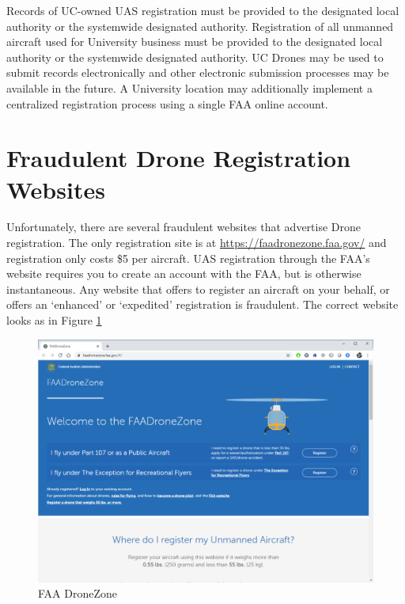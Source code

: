 \documentclass[
]{book}
\begin{document}
Records of UC-owned UAS registration must be provided to the designated local authority or the systemwide designated authority. Registration of all unmanned aircraft used for University business must be provided to the designated local authority or the systemwide designated authority. UC Drones may be used to submit records electronically and other electronic submission processes may be available in the future. A University location may additionally implement a centralized registration process using a single FAA online account.

\hypertarget{fraudulent-drone-registration-websites}{%
\section{Fraudulent Drone Registration Websites}\label{fraudulent-drone-registration-websites}}

Unfortunately, there are several fraudulent websites that advertise Drone registration. The only registration site is at \url{https://faadronezone.faa.gov/} and registration only costs \$5 per aircraft. UAS registration through the FAA's website requires you to create an account with the FAA, but is otherwise instantaneous. Any website that offers to register an aircraft on your behalf, or offers an `enhanced' or `expedited' registration is fraudulent. The correct website looks as in Figure \ref{fig:reg-page}

\begin{figure}

{\centering \includegraphics[width=0.8\linewidth]{images/reg_site} 

}

\caption{FAA DroneZone}\label{fig:reg-page}
\end{figure}
\end{document}

